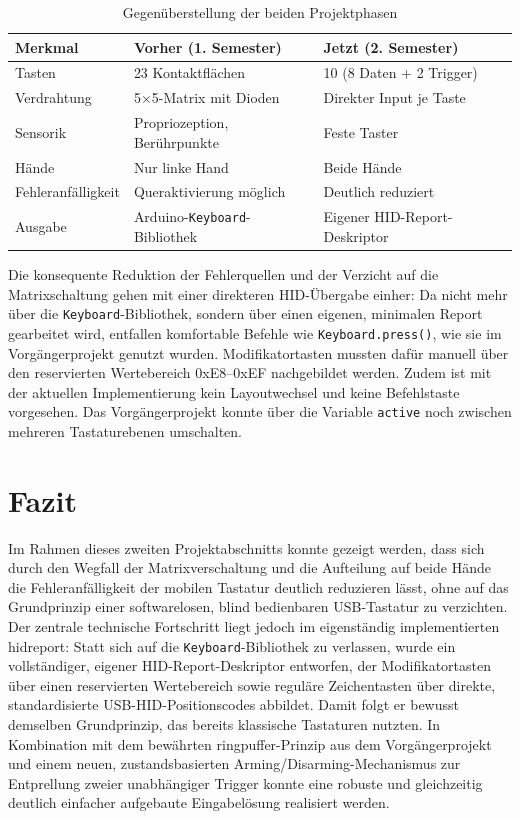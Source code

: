 \documentclass{article}
\begin{document}
\begin{table}[ht]
\centering
\begin{tabular}{lll}
\toprule
\textbf{Merkmal} & \textbf{Vorher (1. Semester)} & \textbf{Jetzt (2. Semester)} \\
\midrule
Tasten & 23 Kontaktflächen & 10 (8 Daten + 2 Trigger) \\
Verdrahtung & 5$\times$5-Matrix mit Dioden & Direkter Input je Taste \\
Sensorik & Propriozeption, Berührpunkte & Feste Taster \\
Hände & Nur linke Hand & Beide Hände \\
Fehleranfälligkeit & Queraktivierung möglich & Deutlich reduziert \\
Ausgabe & Arduino-\texttt{Keyboard}-Bibliothek & Eigener HID-Report-Deskriptor \\
\bottomrule
\end{tabular}
\caption{Gegenüberstellung der beiden Projektphasen}
\end{table}
\FloatBarrier

Die konsequente Reduktion der Fehlerquellen und der Verzicht auf die Matrixschaltung gehen mit einer direkteren HID-Übergabe einher: Da nicht mehr über die \texttt{Keyboard}-Bibliothek, sondern über einen eigenen, minimalen Report gearbeitet wird, entfallen komfortable Befehle wie \texttt{Keyboard.press()}, wie sie im Vorgängerprojekt genutzt wurden. Modifikatortasten mussten dafür manuell über den reservierten Wertebereich 0xE8--0xEF nachgebildet werden. Zudem ist mit der aktuellen Implementierung kein Layoutwechsel und keine Befehlstaste vorgesehen. Das Vorgängerprojekt konnte über die Variable \texttt{active} noch zwischen mehreren Tastaturebenen umschalten.

\section{Fazit}
Im Rahmen dieses zweiten Projektabschnitts konnte gezeigt werden, dass sich durch den Wegfall der Matrixverschaltung und die Aufteilung auf beide Hände die Fehleranfälligkeit der mobilen Tastatur deutlich reduzieren lässt, ohne auf das Grundprinzip einer softwarelosen, blind bedienbaren USB-Tastatur zu verzichten. Der zentrale technische Fortschritt liegt jedoch im eigenständig implementierten \gls{hidreport}: Statt sich auf die \texttt{Keyboard}-Bibliothek zu verlassen, wurde ein vollständiger, eigener HID-Report-Deskriptor entworfen, der Modifikatortasten über einen reservierten Wertebereich sowie reguläre Zeichentasten über direkte, standardisierte USB-HID-Positionscodes abbildet. Damit folgt er bewusst demselben Grundprinzip, das bereits klassische Tastaturen nutzten. In Kombination mit dem bewährten \gls{ringpuffer}-Prinzip aus dem Vorgängerprojekt und einem neuen, zustandsbasierten Arming/Disarming-Mechanismus zur Entprellung zweier unabhängiger Trigger konnte eine robuste und gleichzeitig deutlich einfacher aufgebaute Eingabelösung realisiert werden.
\end{document}
